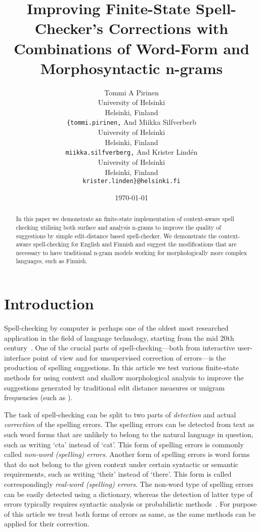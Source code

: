 \documentclass[11pt,a4paper]{article}
\title{Improving Finite-State Spell-Checker's Corrections with Combinations of Word-Form and Morphosyntactic n-grams}
\author{Tommi A Pirinen\\
  University of Helsinki\\
  Helsinki, Finland\\
  {\tt \{tommi.pirinen,} And
  Miikka Silfverberb\\
  University of Helsinki\\
  Helsinki, Finland\\
  {\tt miikka.silfverberg,} And
  Krister Lind\'{e}n\\
  University of Helsinki\\
  Helsinki, Finland\\
  {\tt krister.linden\}@helsinki.fi}
}
\date{\today}
\begin{document}
\maketitle
\begin{abstract}
  In this paper we demonstrate an finite-state implementation of context-aware
  spell checking utilising both surface and analysis n-grams to improve the
  quality of suggestions by simple edit-distance based spell-checker. We
  demonstrate the context-aware spell-checking for English and Finnish and
  suggest the modifications that are necessary to have traditional n-gram
  models working for morphologically more complex languages, such as Finnish.
\end{abstract}

\section{Introduction}

Spell-checking by computer is perhaps one of the oldest most researched
application in the field of language technology, starting from the mid 20th
century~\cite{damerau/1964}. One of the crucial parts of spell-checking---both
from interactive user-interface point of view and for unsupervised correction
of errors---is the production of spelling suggestions.  In this article we test
various finite-state methods for using context and shallow morphological
analysis to improve the suggestions generated by traditional edit distance
measures or unigram frequencies (such as \cite{pirinen/2010/lrec}).

The task of spell-checking can be split to two parts of \emph{detection} and
actual \emph{correction} of the spelling errors. The spelling errors can be
detected from text as such word forms that are unlikely to belong to the
natural language in question, such as writing `cta' instead of `cat'. This form
of spelling errors is commonly called \emph{non-word (spelling) errors}.
Another form of spelling errors is word forms that do not belong to the given
context under certain syntactic or semantic requirements, such as writing
`their' instead of `there'. This form is called correspondingly \emph{real-word
(spelling) errors}. The non-word type of spelling errors can be easily detected
using a dictionary, whereas the detection of latter type of errors typically
requires syntactic analysis or probabilistic methods~\cite{mitton/2009}. For
purpose of this article we treat both forms of errors as same, as the same
methods can be applied for their correction.
\end{document}
